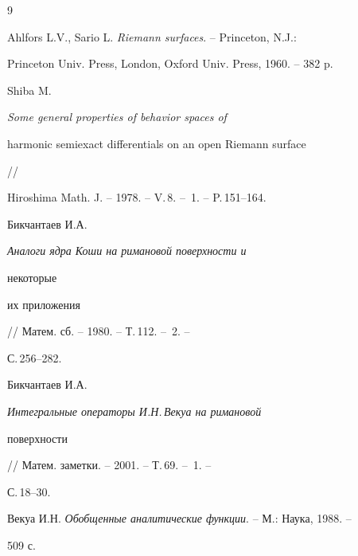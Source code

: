 \begin{thebibliography}{9} 


 




Ahlfors L.V., Sario L. {\em Riemann surfaces}. -- Princeton, N.J.: 


Princeton Univ. Press, London, Oxford Univ. Press, 1960. -- 382 p. 




Shiba M. {\em Some general properties of behavior spaces of 


harmonic semiexact differentials on an open Riemann surface} // 


Hiroshima Math. J. -- 1978. -- V.\,8. -- \No\,1. -- P.\,151--164. 




Бикчантаев И.А. {\em Аналоги ядра Коши на римановой поверхности и 


некоторые 


их приложения} // Матем. сб. -- 1980. -- Т.\,112. -- \No\,2. -- 


С.\,256--282. 




Бикчантаев И.А. {\em Интегральные операторы И.Н.\,Векуа на римановой 


поверхности} // Матем. заметки. -- 2001. -- Т.\,69. -- \No\,1. -- 


С.\,18--30. 




Векуа И.Н. {\em Обобщенные аналитические функции}. -- М.: Наука, 1988. -- 


509 с. 


 


\end{thebibliography} 


 


\vskip 2cm 


 






 


\label{end} 


 


 


